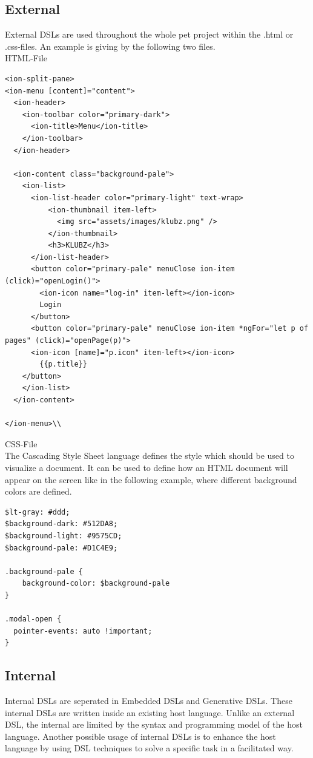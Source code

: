 \documentclass[12pt]{article}
\begin{document}
\subsection{External}
External DSLs are used throughout the whole pet project within the .html or .css-files. An example is giving by the following two files.\\

HTML-File\\
\begin{lstlisting}
<ion-split-pane>
<ion-menu [content]="content">
  <ion-header>
    <ion-toolbar color="primary-dark">
      <ion-title>Menu</ion-title>
    </ion-toolbar>
  </ion-header>

  <ion-content class="background-pale">
    <ion-list>
      <ion-list-header color="primary-light" text-wrap>
          <ion-thumbnail item-left>
            <img src="assets/images/klubz.png" />
          </ion-thumbnail>
          <h3>KLUBZ</h3>
      </ion-list-header>
      <button color="primary-pale" menuClose ion-item (click)="openLogin()">
        <ion-icon name="log-in" item-left></ion-icon>
        Login
      </button>
      <button color="primary-pale" menuClose ion-item *ngFor="let p of pages" (click)="openPage(p)">
      <ion-icon [name]="p.icon" item-left></ion-icon>
        {{p.title}}
    </button>
    </ion-list>
  </ion-content>

</ion-menu>\\
\end{lstlisting}

CSS-File\\
The Cascading Style Sheet language defines the style which should be used to visualize a document. It can be used to define how an HTML document will appear on the screen like in the following example, where different background colors are defined.
\begin{lstlisting}
$lt-gray: #ddd;
$background-dark: #512DA8;
$background-light: #9575CD;
$background-pale: #D1C4E9;

.background-pale {
    background-color: $background-pale
}

.modal-open {
  pointer-events: auto !important;
}
\end{lstlisting}

\subsection{Internal}
Internal DSLs are seperated in Embedded DSLs and Generative DSLs. These internal DSLs are written inside an existing host language. Unlike an external DSL, the internal are limited by the syntax and programming model of the host language. Another possible usage of internal DSLs is to enhance the host language by using DSL techniques to solve a specific task in a facilitated way.
\end{document}
